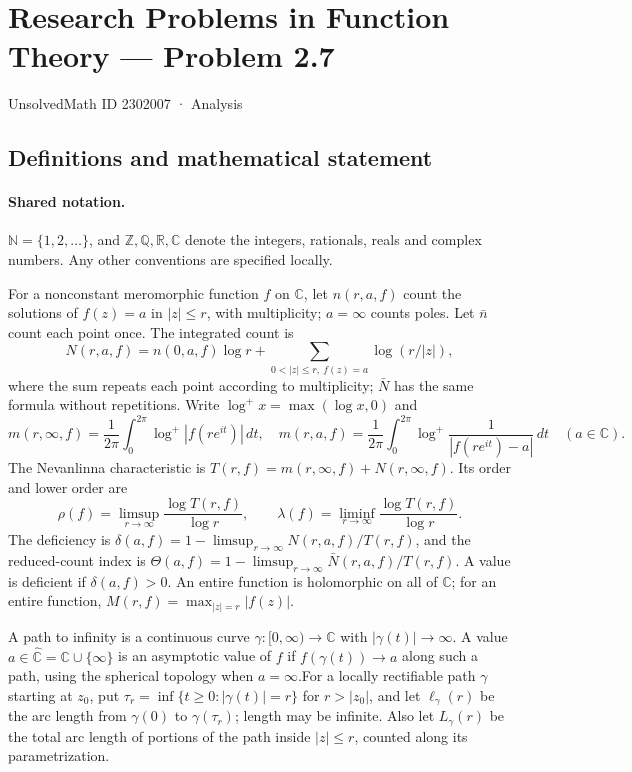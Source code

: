 \documentclass[11pt]{article}
\begin{document}
\setcounter{section}{2302006}
\section{Research Problems in Function Theory — Problem 2.7}\label{2302007}
{\small\sffamily UnsolvedMath ID 2302007 · Analysis}
\subsection{Definitions and mathematical statement}

\paragraph{Shared notation.}$\mathbb N=\{1,2,\ldots\}$, and $\mathbb Z,\mathbb Q,\mathbb R,\mathbb C$ denote the integers, rationals, reals and complex numbers. Any other conventions are specified locally.


For a nonconstant meromorphic function $f$ on $\mathbb C$, let $n(r,a,f)$ count the solutions of $f(z)=a$ in $|z|\le r$, with multiplicity; $a=\infty$ counts poles. Let $\bar n$ count each point once. The integrated count is
\[
 N(r,a,f)=n(0,a,f)\log r+\sum_{0<|z|\le r,\ f(z)=a}\log(r/|z|),
\]
where the sum repeats each point according to multiplicity; $\bar N$ has the same formula without repetitions. Write $\log^+x=\max(\log x,0)$ and
\[
 m(r,\infty,f)=\frac1{2\pi}\int_0^{2\pi}\log^+|f(re^{it})|\,dt,\quad
 m(r,a,f)=\frac1{2\pi}\int_0^{2\pi}\log^+\frac1{|f(re^{it})-a|}\,dt\quad(a\in\mathbb C).
\]
The Nevanlinna characteristic is $T(r,f)=m(r,\infty,f)+N(r,\infty,f)$. Its order and lower order are
\[
 \rho(f)=\limsup_{r\to\infty}\frac{\log T(r,f)}{\log r},\qquad
 \lambda(f)=\liminf_{r\to\infty}\frac{\log T(r,f)}{\log r}.
\]
The deficiency is $\delta(a,f)=1-\limsup_{r\to\infty}N(r,a,f)/T(r,f)$, and the reduced-count index is $\Theta(a,f)=1-\limsup_{r\to\infty}\bar N(r,a,f)/T(r,f)$. A value is deficient if $\delta(a,f)>0$. An entire function is holomorphic on all of $\mathbb C$; for an entire function, $M(r,f)=\max_{|z|=r}|f(z)|$.

A path to infinity is a continuous curve $\gamma:[0,\infty)\to\mathbb C$ with $|\gamma(t)|\to\infty$. A value $a\in\widehat{\mathbb C}=\mathbb C\cup\{\infty\}$ is an asymptotic value of $f$ if $f(\gamma(t))\to a$ along such a path, using the spherical topology when $a=\infty$.For a locally rectifiable path $\gamma$ starting at $z_0$, put $\tau_r=\inf\{t\ge0:|\gamma(t)|=r\}$ for $r>|z_0|$, and let $\ell_\gamma(r)$ be the arc length from $\gamma(0)$ to $\gamma(\tau_r)$; length may be infinite. Also let $L_\gamma(r)$ be the total arc length of portions of the path inside $|z|\le r$, counted along its parametrization.
\end{document}
